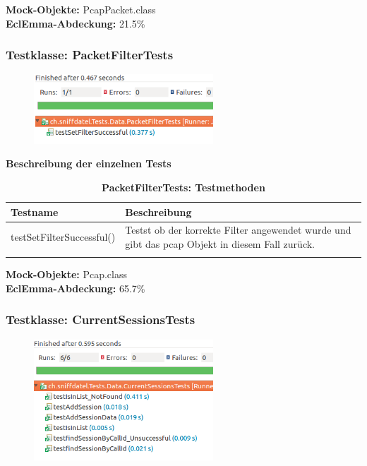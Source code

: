 \documentclass[a4,12pt]{scrartcl}
\begin{document}
\noindent \textbf{Mock-Objekte:} PcapPacket.class\\
\textbf{EclEmma-Abdeckung:} 21.5\%


\subsubsection{Testklasse: PacketFilterTests}
\begin{figure} [H]
	\begin{center}
	\includegraphics[width=0.60\textwidth]{./pictures/PacketFilterTests.png}
	\label{Bild Referenz}
	\end{center}
\end{figure}

\textbf{Beschreibung der einzelnen Tests}
\begin{longtable}{ p{7cm} p{7cm} }     
    {Testname} & {Beschreibung}\\ \midrule
    testSetFilterSuccessful() & Testst ob der korrekte Filter angewendet wurde und gibt das pcap Objekt in diesem Fall zurück.\\ 
\caption{\textbf{PacketFilterTests: Testmethoden}}
\end{longtable}

\noindent \textbf{Mock-Objekte:} Pcap.class\\
\textbf{EclEmma-Abdeckung:} 65.7\%

\subsubsection{Testklasse: CurrentSessionsTests}
\begin{figure} [H]
	\begin{center}
	\includegraphics[width=0.60\textwidth]{./pictures/CurrentSessionTests.png}
	\label{Bild Referenz}
	\end{center}
\end{figure}
\end{document}
